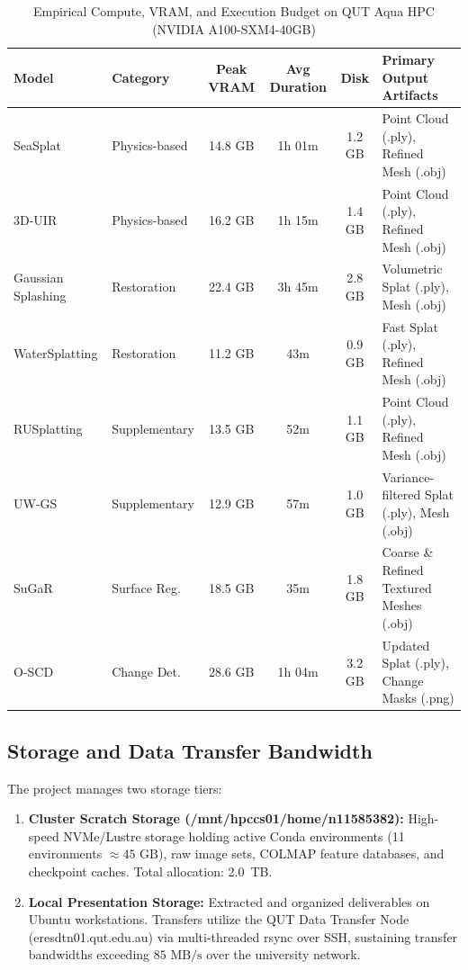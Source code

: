 \begin{table}[htbp]
    \centering
    \small
    \setlength{\tabcolsep}{5pt}
    \renewcommand{\arraystretch}{1.15}
    \caption{Empirical Compute, VRAM, and Execution Budget on QUT Aqua HPC (NVIDIA A100-SXM4-40GB)}
    \label{tab:compute_budget}
    \begin{tabularx}{\textwidth}{l l c c c X}
        \toprule
        \textbf{Model} & \textbf{Category} & \textbf{Peak VRAM} & \textbf{Avg Duration} & \textbf{Disk} & \textbf{Primary Output Artifacts} \\
        \midrule
        SeaSplat & Physics-based & 14.8 GB & 1h 01m & 1.2 GB & Point Cloud (.ply), Refined Mesh (.obj) \\
        3D-UIR & Physics-based & 16.2 GB & 1h 15m & 1.4 GB & Point Cloud (.ply), Refined Mesh (.obj) \\
        Gaussian Splashing & Restoration & 22.4 GB & 3h 45m & 2.8 GB & Volumetric Splat (.ply), Mesh (.obj) \\
        WaterSplatting & Restoration & 11.2 GB & 43m & 0.9 GB & Fast Splat (.ply), Refined Mesh (.obj) \\
        RUSplatting & Supplementary & 13.5 GB & 52m & 1.1 GB & Point Cloud (.ply), Refined Mesh (.obj) \\
        UW-GS & Supplementary & 12.9 GB & 57m & 1.0 GB & Variance-filtered Splat (.ply), Mesh (.obj) \\
        SuGaR & Surface Reg. & 18.5 GB & 35m & 1.8 GB & Coarse \& Refined Textured Meshes (.obj) \\
        O-SCD & Change Det. & 28.6 GB & 1h 04m & 3.2 GB & Updated Splat (.ply), Change Masks (.png) \\
        \bottomrule
    \end{tabularx}
\end{table}

\subsection{Storage and Data Transfer Bandwidth}
The project manages two storage tiers:
\begin{enumerate}
    \item \textbf{Cluster Scratch Storage (/mnt/hpccs01/home/n11585382):} High-speed NVMe/Lustre storage holding active Conda environments (11 environments $\approx 45\text{ GB}$), raw image sets, COLMAP feature databases, and checkpoint caches. Total allocation: 2.0~TB.
    \item \textbf{Local Presentation Storage:} Extracted and organized deliverables on Ubuntu workstations. Transfers utilize the QUT Data Transfer Node (eresdtn01.qut.edu.au) via multi-threaded rsync over SSH, sustaining transfer bandwidths exceeding $85\text{ MB/s}$ over the university network.
\end{enumerate}

